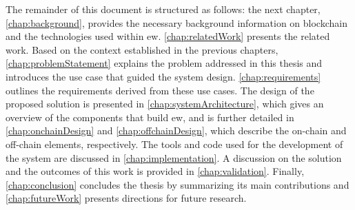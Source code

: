 The remainder of this document is structured as follows: the next chapter, \cref{chap:background}, provides the necessary background information on blockchain and the technologies used within \gls{ew}. \cref{chap:relatedWork} presents the related work. Based on the context established in the previous chapters, \cref{chap:problemStatement} explains the problem addressed in this thesis and introduces the use case that guided the system design. \cref{chap:requirements} outlines the requirements derived from these use cases.
The design of the proposed solution is presented in \cref{chap:systemArchitecture}, which gives an overview of the components that build \gls{ew}, and is further detailed in \cref{chap:onchainDesign} and \cref{chap:offchainDesign}, which describe the on-chain and off-chain elements, respectively. The tools and code used for the development of the system are discussed in \cref{chap:implementation}.
A discussion on the solution and the outcomes of this work is provided in \cref{chap:validation}. Finally, \cref{chap:conclusion}  concludes the thesis by summarizing its main contributions and \cref{chap:futureWork} presents directions for future research.